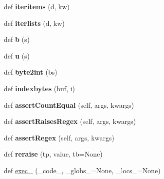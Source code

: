 \begin{DoxyCompactItemize}
def {\bfseries iteritems} (d, kw)
\item 
\mbox{\label{namespacesetuptools_1_1__vendor_1_1six_ac8a90110494abf65513488d00ed4d678}} 
def {\bfseries iterlists} (d, kw)
\item 
\mbox{\label{namespacesetuptools_1_1__vendor_1_1six_a5009030aca1eb172cc16bca719a6f6f9}} 
def {\bfseries b} (s)
\item 
\mbox{\label{namespacesetuptools_1_1__vendor_1_1six_a79434b0281bda2ab9006318fc56a2aaf}} 
def {\bfseries u} (s)
\item 
\mbox{\label{namespacesetuptools_1_1__vendor_1_1six_a378b0e70a2f260305556f67a731c6f0c}} 
def {\bfseries byte2int} (bs)
\item 
\mbox{\label{namespacesetuptools_1_1__vendor_1_1six_a6ab945756e5d6ab59ca834b0a206c2cc}} 
def {\bfseries indexbytes} (buf, i)
\item 
\mbox{\label{namespacesetuptools_1_1__vendor_1_1six_a019f153fd15719fddc621c60b60540f9}} 
def {\bfseries assert\+Count\+Equal} (self, args, kwargs)
\item 
\mbox{\label{namespacesetuptools_1_1__vendor_1_1six_a29f4a0b493a819808c352d1ff63d6f86}} 
def {\bfseries assert\+Raises\+Regex} (self, args, kwargs)
\item 
\mbox{\label{namespacesetuptools_1_1__vendor_1_1six_a6f073ca1764cf390c877a029686b19ac}} 
def {\bfseries assert\+Regex} (self, args, kwargs)
\item 
\mbox{\label{namespacesetuptools_1_1__vendor_1_1six_a7b66cc0f60a86added05d1247c056233}} 
def {\bfseries reraise} (tp, value, tb=None)
\item 
def \hyperlink{namespacesetuptools_1_1__vendor_1_1six_a71fc63778fb76a399990180b658ad4ad}{exec\+\_\+} (\+\_\+code\+\_\+, \+\_\+globs\+\_\+=None, \+\_\+locs\+\_\+=None)

\end{DoxyCompactItemize}
